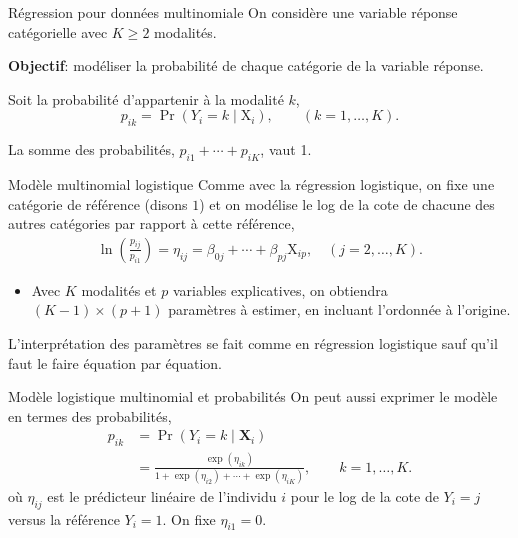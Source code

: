 \documentclass[
  ignorenonframetext,
]{beamer}
\providecommand{\tightlist}{%
  \setlength{\itemsep}{0pt}\setlength{\parskip}{0pt}}\usepackage{longtable,booktabs,array}
\begin{document}
\begin{frame}{Régression pour données multinomiale}
\label{ruxe9gression-pour-donnuxe9es-multinomiale}
On considère une variable réponse catégorielle avec \(K \ge 2\)
modalités.

\textbf{Objectif}: modéliser la probabilité de chaque catégorie de la
variable réponse.

Soit la probabilité d'appartenir à la modalité \(k\),
\[p_{ik} = \Pr(Y_i=k \mid \mathrm{X}_i), \qquad (k=1, \ldots, K).\]

La somme des probabilités, \(p_{i1} + \cdots + p_{iK}\), vaut 1.
\end{frame}

\begin{frame}{Modèle multinomial logistique}
\label{moduxe8le-multinomial-logistique}
Comme avec la régression logistique, on fixe une catégorie de référence
(disons \(1\)) et on modélise le log de la cote de chacune des autres
catégories par rapport à cette référence, \begin{align*}
 \ln\left(\frac{p_{ij}}{p_{i1}}\right) = \eta_{ij} = \beta_{0j} + \cdots + \beta_{pj} \mathrm{X}_{ip}, \quad (j=2, \ldots, K).
\end{align*}

\begin{itemize}
\tightlist
\item
  Avec \(K\) modalités et \(p\) variables explicatives, on obtiendra
  \((K-1)\times (p+1)\) paramètres à estimer, en incluant l'ordonnée à
  l'origine.
\end{itemize}

L'interprétation des paramètres se fait comme en régression logistique
sauf qu'il faut le faire équation par équation.
\end{frame}

\begin{frame}{Modèle logistique multinomial et probabilités}
\label{moduxe8le-logistique-multinomial-et-probabilituxe9s}
On peut aussi exprimer le modèle en termes des probabilités,
\begin{align*}
 p_{ik} &= \Pr(Y_i=k \mid \mathbf{X}_i) \\&= \frac{\exp(\eta_{ik})}{1+ \exp(\eta_{i2}) + \cdots + \exp(\eta_{iK})}, \qquad k =1, \ldots, K.
\end{align*} où \(\eta_{ij}\) est le prédicteur linéaire de l'individu
\(i\) pour le log de la cote de \(Y_i=j\) versus la référence \(Y_i=1\).
On fixe \(\eta_{i1}=0\).
\end{frame}
\end{document}
